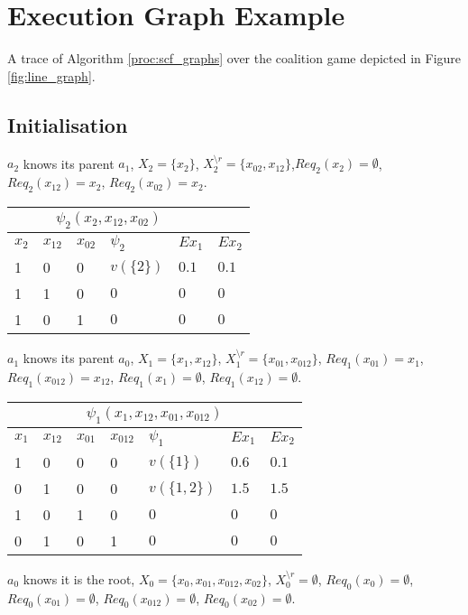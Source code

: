\documentclass{article}
\begin{document}
\section{Execution Graph Example}
A trace of Algorithm \ref{proc:scf_graphs} over the coalition game depicted in 
Figure \ref{fig:line_graph}.
\subsection{Initialisation}

\noindent $a_2$ knows its parent $a_1$, $X_2=\{x_2\}$, $X^{\setminus
r}_2=\{x_{02},x_{12}\}$,$Req_2(x_{2})=\emptyset$, $Req_2(x_{12})=x_2$,
$Req_2(x_{02})=x_{2}$.


\noindent\begin{tabular}{ | l | l |  l | l | l | l | }
\multicolumn{5}{c}{$\psi_2(x_{2},x_{12},x_{02})$}  \\
\hline
	$x_{2}$ &	$x_{12}$ & $x_{02}$ & $\psi_2$ & $Ex_1$ & $Ex_2$ \\
\hline
	1	 &		0	 &	0	& $v(\{2\})$ & $0.1$ & $0.1$\\
	1	 &		1	 &	0	& $0$ & $0$ & $0$ \\
	1	 &		0	 &	1	& $0$ & $0$ & $0$\\
\hline
\end{tabular}

\noindent $a_1$ knows its parent $a_0$, $X_1=\{x_1,x_{12}\}$,
$X^{\setminus r}_1=\{x_{01},x_{012}\}$, $Req_1(x_{01})=x_1$,
$Req_1(x_{012})=x_{12}$, $Req_1(x_{1})=\emptyset$,
$Req_1(x_{12})=\emptyset$.


\noindent\begin{tabular}{ | l | l |  l | l | l |l | l |}
\multicolumn{7}{c}{$\psi_1(x_{1},x_{12},x_{01},x_{012})$}  \\
\hline
	$x_{1}$ &	$x_{12}$ & $x_{01}$ & $x_{012}$ & $\psi_1$ & $Ex_1$ & $Ex_2$ \\
\hline
	1	 &		0	 &  0	&  0 & $v(\{1\})$ & $0.6$  & $0.1$\\
	0	 &		1	 &	0 	&  0 & $v(\{1,2\})$&$1.5$ & $1.5$\\
	1	 &		0	 &  1	&  0 & $0$ & $0$ & $0$\\
	0	 &		1	 &	0 	&  1 & $0$ & $0$ & $0$\\
\hline
\end{tabular}


\noindent $a_0$ knows it is the root, $X_0=\{x_0,x_{01},x_{012},x_{02}\}$,
$X^{\setminus r}_0=\emptyset$, $Req_0(x_{0})=\emptyset$,$Req_0(x_{01})=\emptyset$,
$Req_0(x_{012})=\emptyset$, $Req_0(x_{02})=\emptyset$.
\end{document}
